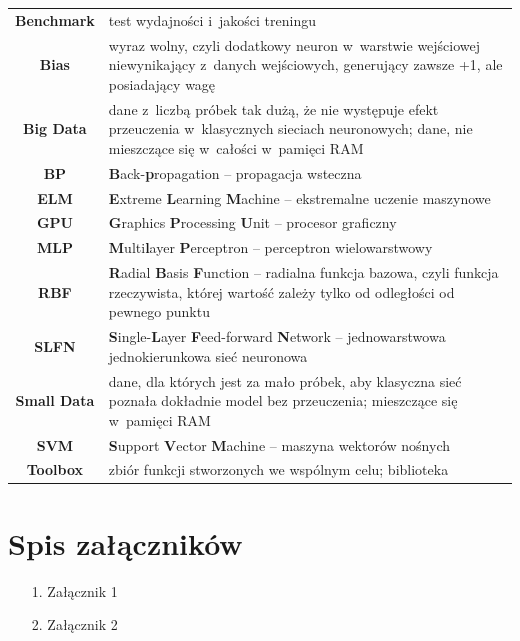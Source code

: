 \documentclass[pl]{minipw} %
\begin{document}
\begin{tabularx}{\textwidth}{cX}
\textbf{Benchmark} & test wydajności i~jakości treningu \\
\textbf{Bias} & wyraz wolny, czyli dodatkowy neuron w~warstwie wejściowej niewynikający z~danych wejściowych, generujący zawsze +1, ale posiadający wagę \\
\textbf{Big Data} & dane z~liczbą próbek tak dużą, że nie występuje efekt przeuczenia w~klasycznych sieciach neuronowych; dane, nie mieszczące się w~całości w~pamięci RAM \\ 
\textbf{BP} & \textbf{B}ack-\textbf{p}ropagation -- propagacja wsteczna \\ 
\textbf{ELM} & \textbf{E}xtreme \textbf{L}earning \textbf{M}achine -- ekstremalne uczenie maszynowe \\ 
\textbf{GPU} & \textbf{G}raphics \textbf{P}rocessing \textbf{U}nit -- procesor graficzny \\ 
\textbf{MLP} & \textbf{M}ulti\textbf{l}ayer \textbf{P}erceptron -- perceptron wielowarstwowy \\ 
\textbf{RBF} & \textbf{R}adial \textbf{B}asis \textbf{F}unction -- radialna funkcja bazowa, czyli funkcja rzeczywista, której wartość zależy tylko od odległości od pewnego punktu \\ 
\textbf{SLFN} & \textbf{S}ingle-\textbf{L}ayer \textbf{F}eed-forward \textbf{N}etwork -- jednowarstwowa jednokierunkowa sieć neuronowa \\ 
\textbf{Small Data} & dane, dla których jest za mało próbek, aby klasyczna sieć poznała dokładnie model bez przeuczenia; mieszczące się w~pamięci RAM \\ 
\textbf{SVM} & \textbf{S}upport \textbf{V}ector \textbf{M}achine -- maszyna wektorów nośnych \\ 
\textbf{Toolbox} & zbiór funkcji stworzonych we wspólnym celu; biblioteka \\ 
\end{tabularx}


\listoffigures


\listoftables


\chapter*{Spis załączników}
\begin{enumerate}
\item[1.] Załącznik 1
\item[2.] Załącznik 2
\end{enumerate}
\end{document}
